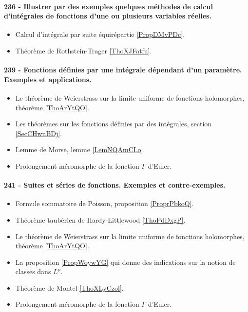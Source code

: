 \paragraph{236 - Illustrer par des exemples quelques méthodes de calcul d’intégrales de fonctions d’une ou plusieurs variables réelles.}
\begin{itemize}
    \item Calcul d'intégrale par suite équirépartie \ref{PropDMvPDc}.
    \item Théorème de Rothstein-Trager \ref{ThoXJFatfu}.
\end{itemize}
\paragraph{239 - Fonctions définies par une intégrale dépendant d’un paramètre. Exemples et applications.}
\begin{itemize}
    \item Le théorème de Weierstrass sur la limite uniforme de fonctions holomorphes, théorème \ref{ThoArYtQO}.
    \item Les théorèmes sur les fonctions définies par des intégrales, section \ref{SecCHwnBDj}.
    \item Lemme de Morse, lemme \ref{LemNQAmCLo}.
    \item Prolongement méromorphe de la fonction \( \Gamma\) d'Euler.
\end{itemize}
\paragraph{241 - Suites et séries de fonctions. Exemples et contre-exemples.}
\begin{itemize}
    \item Formule sommatoire de Poisson, proposition \ref{ProprPbkoQ}.
    \item Théorème taubérien de Hardy-Littlewood \ref{ThoPdDxgP}.
    \item Le théorème de Weierstrass sur la limite uniforme de fonctions holomorphes, théorème \ref{ThoArYtQO}.
    \item La proposition \ref{PropWoywYG} qui donne des indications sur la notion de classes dans \( L^p\).
    \item Théorème de Montel \ref{ThoXLyCzol}.
    \item Prolongement méromorphe de la fonction \( \Gamma\) d'Euler.
\end{itemize}
